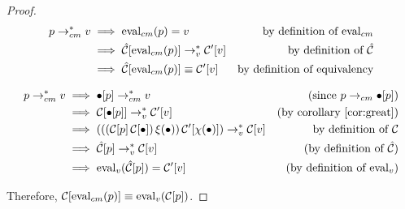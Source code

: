\begin{proof}

\begin{align*}
p\rightarrow_{cm}^{*} v &\implies\mathrm{eval}_{cm}(p)=v &\text{by definition of $\mathrm{eval}_{cm}$}\\
          &\implies\hat{\mathcal{C}}[\mathrm{eval}_{cm}(p)]\rightarrow_v^{*}\mathcal{C}'[v] &\text{by definition of $\hat{\mathcal{C}}$}\\
          &\implies\hat{\mathcal{C}}[\mathrm{eval}_{cm}(p)]\equiv\mathcal{C}'[v] &\text{by definition of equivalency}\\
\end{align*}

\begin{align*}
p\rightarrow_{cm}^{*} v &\implies\bullet[p]\rightarrow_{cm}^{*} v &\text{(since $p\rightarrow_{cm}\bullet[p]$)}\\
          &\implies\mathcal{C}[\bullet[p]]\rightarrow_v^{*}\mathcal{C}'[v] &\text{(by corollary \ref{cor:great})}\\
          &\implies(((\mathcal{C}[p]\,\mathcal{C}[\bullet])\,\xi(\bullet))\,\mathcal{C}'[\chi(\bullet)])\rightarrow_v^{*}\mathcal{C}[v]&\text{by definition of $\mathcal{C}$}\\
          &\implies\hat{\mathcal{C}}[p]\rightarrow_v^{*}\mathcal{C}[v]&\text{(by definition of $\hat{\mathcal{C}}$)}\\
          &\implies\mathrm{eval}_{v}(\hat{\mathcal{C}}[p])=\mathcal{C}'[v] &\text{(by definition of $\mathrm{eval}_v$)}
\end{align*}

Therefore, $\mathcal{C}[\mathrm{eval}_{cm}(p)]\equiv\mathrm{eval}_{v}(\mathcal{C}[p])$.
\end{proof}
